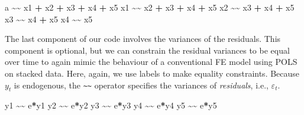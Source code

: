 \documentclass[]{interact}
\theoremstyle{plain}%
\theoremstyle{definition}
\theoremstyle{remark}
\newenvironment{Shaded}{\begin{snugshade}}{\end{snugshade}}
\newcommand{\ErrorTok}[1]{\textcolor[rgb]{0.64,0.00,0.00}{\textbf{#1}}}
\newcommand{\NormalTok}[1]{#1}
\newcommand{\OperatorTok}[1]{\textcolor[rgb]{0.81,0.36,0.00}{\textbf{#1}}}
\newcommand{\StringTok}[1]{\textcolor[rgb]{0.31,0.60,0.02}{#1}}
\begin{document}
\singlespacing

\begin{Shaded}
\begin{Highlighting}[]
\NormalTok{a }\OperatorTok{\textasciitilde{}}\ErrorTok{\textasciitilde{}}\StringTok{ }\NormalTok{x1 }\OperatorTok{+}\StringTok{ }\NormalTok{x2 }\OperatorTok{+}\StringTok{ }\NormalTok{x3 }\OperatorTok{+}\StringTok{ }\NormalTok{x4 }\OperatorTok{+}\StringTok{ }\NormalTok{x5}
\NormalTok{x1 }\OperatorTok{\textasciitilde{}}\ErrorTok{\textasciitilde{}}\StringTok{ }\NormalTok{x2 }\OperatorTok{+}\StringTok{ }\NormalTok{x3 }\OperatorTok{+}\StringTok{ }\NormalTok{x4 }\OperatorTok{+}\StringTok{ }\NormalTok{x5}
\NormalTok{x2 }\OperatorTok{\textasciitilde{}}\ErrorTok{\textasciitilde{}}\StringTok{ }\NormalTok{x3 }\OperatorTok{+}\StringTok{ }\NormalTok{x4 }\OperatorTok{+}\StringTok{ }\NormalTok{x5}
\NormalTok{x3 }\OperatorTok{\textasciitilde{}}\ErrorTok{\textasciitilde{}}\StringTok{ }\NormalTok{x4 }\OperatorTok{+}\StringTok{ }\NormalTok{x5}
\NormalTok{x4 }\OperatorTok{\textasciitilde{}}\ErrorTok{\textasciitilde{}}\StringTok{ }\NormalTok{x5}
\end{Highlighting}
\end{Shaded}

\doublespacing

The last component of our code involves the variances of the residuals.
This component is optional, but we can constrain the residual variances
to be equal over time to again mimic the behaviour of a conventional FE
model using POLS on stacked data. Here, again, we use labels to make
equality constraints. Because \(y_{t}\) is endogenous, the
\texttt{\textasciitilde{}\textasciitilde{}} operator specifies the
variances of \emph{residuals}, i.e., \(\varepsilon_{t}\).

\singlespacing

\begin{Shaded}
\begin{Highlighting}[]
\NormalTok{y1 }\OperatorTok{\textasciitilde{}}\ErrorTok{\textasciitilde{}}\StringTok{ }\NormalTok{e}\OperatorTok{*}\NormalTok{y1}
\NormalTok{y2 }\OperatorTok{\textasciitilde{}}\ErrorTok{\textasciitilde{}}\StringTok{ }\NormalTok{e}\OperatorTok{*}\NormalTok{y2}
\NormalTok{y3 }\OperatorTok{\textasciitilde{}}\ErrorTok{\textasciitilde{}}\StringTok{ }\NormalTok{e}\OperatorTok{*}\NormalTok{y3}
\NormalTok{y4 }\OperatorTok{\textasciitilde{}}\ErrorTok{\textasciitilde{}}\StringTok{ }\NormalTok{e}\OperatorTok{*}\NormalTok{y4}
\NormalTok{y5 }\OperatorTok{\textasciitilde{}}\ErrorTok{\textasciitilde{}}\StringTok{ }\NormalTok{e}\OperatorTok{*}\NormalTok{y5}
\end{Highlighting}
\end{Shaded}
\end{document}

